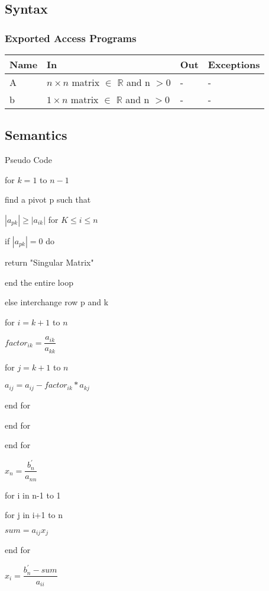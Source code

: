 \documentclass[12pt, titlepage]{article}
\begin{document}
\subsection{Syntax}

\subsubsection{Exported Access Programs}

\begin{center}
\begin{tabular}{p{2cm} p{4cm} p{4cm} p{2cm}}
\hline
\textbf{Name} & \textbf{In} & \textbf{Out} & \textbf{Exceptions} \\
\hline

A & $n \times n$ matrix $\in$ $\mathbb{R}$ and n $> 0$ & - & - \\
b & $1 \times n$ matrix $\in$ $\mathbb{R}$ and n $> 0$ & - & - \\
\hline
\end{tabular}
\end{center}

\subsection{Semantics}
Pseudo Code

for $k = 1$ to $n-1$

find a pivot p such that

$|a_{pk}| \geq |a_{ik}|$ for $K \leq i \leq n$

if $|a_{pk}| = 0$ do

return "Singular Matrix"

end the entire loop

else interchange row p and k

for $i = k+1$ to $n$

$factor_{ik} = \dfrac{a_{ik}}{a_{kk}}$

for $j = k+1$ to $n$

$a_{ij} = a_{ij} - factor_{ik} * a_{kj}$

end for

end for

end for

$x_n = \dfrac{b_n^{'}}{a_{nn}} $

for i in n-1 to 1

for j in i+1 to n

$sum = a_{ij}x_j$

end for

$x_i = \dfrac{b_n^{'} - sum} {a_{ii}}$
\end{document}
